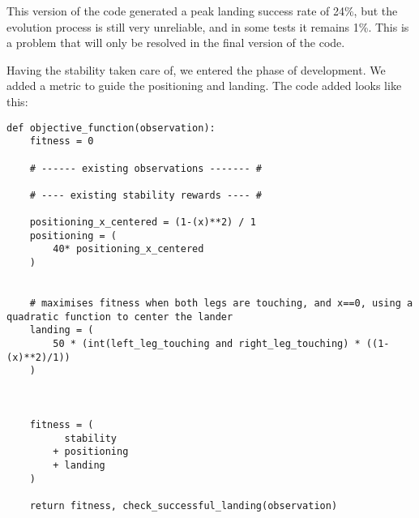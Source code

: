 \documentclass{article}
\begin{document}
This version of the code generated a peak landing success rate of 24\%, but the evolution process is still very unreliable, and in some tests it remains 1\%. This is a problem that will only be resolved in the final version of the code.


Having the stability taken care of, we entered the phase of development. We added a metric to guide the positioning and landing. The code added looks like this:
\begin{lstlisting}
def objective_function(observation):
    fitness = 0

    # ------ existing observations ------- #

    # ---- existing stability rewards ---- #

    positioning_x_centered = (1-(x)**2) / 1
    positioning = (
        40* positioning_x_centered
    )


    # maximises fitness when both legs are touching, and x==0, using a quadratic function to center the lander
    landing = (
        50 * (int(left_leg_touching and right_leg_touching) * ((1-(x)**2)/1))
    )



    fitness = (
          stability
        + positioning
        + landing
    )

    return fitness, check_successful_landing(observation)
\end{lstlisting}
\end{document}
